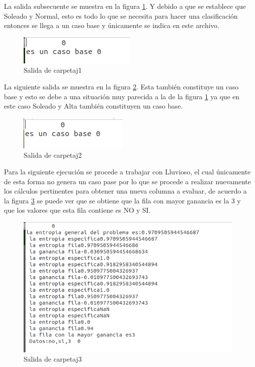 La salida subsecuente se muestra en la figura \ref{fig:ID316}. Y debido a que se establece que Soleado y Normal, esto es todo lo que se necesita para hacer una clasificación entonces se llega a un caso base y únicamente se indica en este archivo.
\begin{figure}[H]
	\begin{center}
		\hypertarget{fig:ID316}{\hspace{1pt}}
		\includegraphics[width=.3\textwidth]{capitulo4a/images/ID3_21.png}
		\caption{Salida de carpetaj1}
		\label{fig:ID316}
	\end{center}
\end{figure}
La siguiente salida se muestra en la figura \ref{fig:ID317}. Esta también constituye un caso base y esto se debe a una situación muy parecida a la de la figura \ref{fig:ID316} ya que en este caso Soleado y Alta también constituyen un caso base. 
\begin{figure}[H]
	\begin{center}
		\hypertarget{fig:ID317}{\hspace{1pt}}
		\includegraphics[width=.3\textwidth]{capitulo4a/images/ID3_22.png}
		\caption{Salida de carpetaj2}
		\label{fig:ID317}
	\end{center}
\end{figure}
Para la siguiente ejecución se procede a trabajar con Lluvioso, el cual únicamente de esta forma no genera un caso pase por lo que se procede a realizar nuevamente los cálculos pertinentes para obtener una nueva columna a evaluar, de acuerdo a la figura \ref{fig:ID318} se puede ver que se obtiene que la fila con mayor ganancia es la 3 y que los valores que esta fila contiene es NO y SI.
\begin{figure}[H]
	\begin{center}
		\hypertarget{fig:ID318}{\hspace{1pt}}
		\includegraphics[width=.7\textwidth]{capitulo4a/images/ID3_23.png}
		\caption{Salida de carpetaj3}
		\label{fig:ID318}
	\end{center}
\end{figure}
